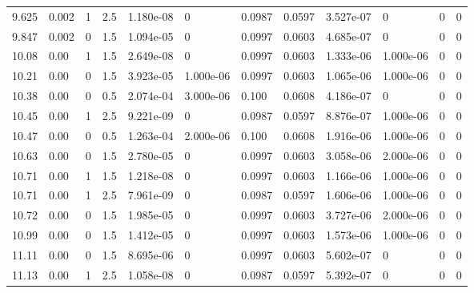 \documentclass[preview]{standalone}
\begin{document}
{{{\begin{tabular}{L{1.2cm}C{1.2cm} C{0.3cm}C{0.5cm} C{1.4cm}C{1.4cm} C{1.4cm}C{1.4cm} C{1.6cm}C{1.6cm} C{1.6cm}C{1.6cm}}
  9.625  &  0.002  & 1     & 2.5 &  1.180e-08  & 0  &  0.0987&   0.0597& 3.527e-07 & 0   &  0 & 0  \\ 
  9.847  &  0.002  & 0     & 1.5 &  1.094e-05  & 0  &  0.0997&   0.0603& 4.685e-07 & 0   &  0 & 0  \\ 
  10.08  &  0.00  & 1     & 1.5 &  2.649e-08  & 0  &  0.0997&   0.0603& 1.333e-06 & 1.000e-06   &  0 & 0  \\ 
  10.21  &  0.00  & 0     & 1.5 &  3.923e-05  & 1.000e-06  &  0.0997&   0.0603& 1.065e-06 & 1.000e-06   &  0 & 0  \\ 
  10.38  &  0.00  & 0     & 0.5 &  2.074e-04  & 3.000e-06  &  0.100&   0.0608& 4.186e-07 & 0   &  0 & 0  \\ 
  10.45  &  0.00  & 1     & 2.5 &  9.221e-09  & 0  &  0.0987&   0.0597& 8.876e-07 & 1.000e-06   &  0 & 0  \\ 
  10.47  &  0.00  & 0     & 0.5 &  1.263e-04  & 2.000e-06  &  0.100&   0.0608& 1.916e-06 & 1.000e-06   &  0 & 0  \\ 
  10.63  &  0.00  & 0     & 1.5 &  2.780e-05  & 0  &  0.0997&   0.0603& 3.058e-06 & 2.000e-06   &  0 & 0  \\ 
  10.71  &  0.00  & 1     & 1.5 &  1.218e-08  & 0  &  0.0997&   0.0603& 1.166e-06 & 1.000e-06   &  0 & 0  \\ 
  10.71  &  0.00  & 1     & 2.5 &  7.961e-09  & 0  &  0.0987&   0.0597& 1.606e-06 & 1.000e-06   &  0 & 0  \\ 
  10.72  &  0.00  & 0     & 1.5 &  1.985e-05  & 0  &  0.0997&   0.0603& 3.727e-06 & 2.000e-06   &  0 & 0  \\ 
  10.99  &  0.00  & 0     & 1.5 &  1.412e-05  & 0  &  0.0997&   0.0603& 1.573e-06 & 1.000e-06   &  0 & 0  \\ 
  11.11  &  0.00  & 0     & 1.5 &  8.695e-06  & 0  &  0.0997&   0.0603& 5.602e-07 & 0   &  0 & 0  \\ 
  11.13  &  0.00  & 1     & 2.5 &  1.058e-08  & 0  &  0.0987&   0.0597& 5.392e-07 & 0   &  0 & 0  \\ 
\hline 
\end{tabular} 

}}}
\end{document}
